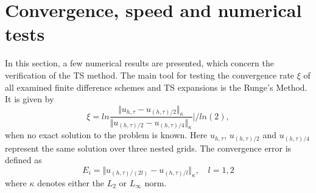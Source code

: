 \documentclass[11pt,a4paper,twoside]{article}
\begin{document}
\section{Convergence, speed and numerical tests}\label{NumTests}
In this section, a few numerical results are presented, which concern the verification of the TS method. The main tool for testing the convergence rate $\xi$ of all examined finite difference schemes and TS expansions is the Runge's Method. It is given by
\begin{equation}\label{Runge}
\xi = ln  \frac{\Vert u_{h,\tau} - u_{(h,\tau)/2} \Vert_\kappa } {\Vert  u_{(h,\tau)/2} - u_{(h,\tau)/4} \Vert_\kappa  } | / ln(2),
\end{equation}
when no exact solution to the problem is known. Here $u_{h,\tau}$, $u_{(h,\tau)/2}$ and $u_{(h,\tau)/4}$ represent the same solution over three nested grids. The convergence error is defined as
\begin{equation}\label{Norm}
E_i = \Vert u_{(h,\tau)/(2l)} - u_{(h,\tau)/l} \Vert_\kappa, \quad l = 1,2
\end{equation}
where $\kappa$ denotes either the $L_2$ or $L_\infty$  norm.
\end{document}
